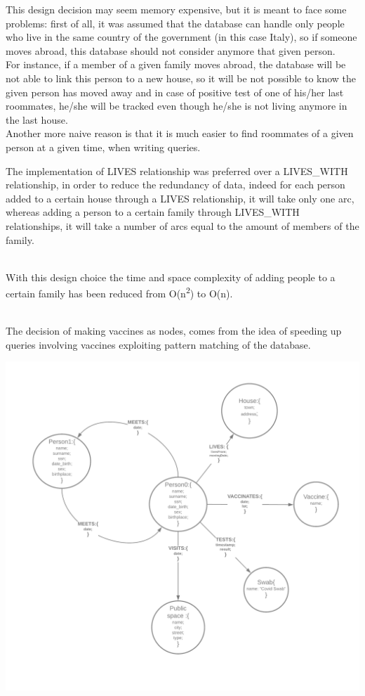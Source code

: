\documentclass{article}
\begin{document}
This design decision may seem memory expensive, but it is meant to face some problems: first of all, it was assumed that the database
can handle only people who live in the same country of the government (in this case Italy), so if someone moves abroad, this database should not consider anymore that given person.
\\For instance, if a member of a given family moves abroad, the database
will be not able to link this person to a new house, so it will be not possible to know the given person has moved away and in
case of positive test of one of his/her last roommates, he/she will be tracked even though he/she is not living anymore in the last house.
\\Another more naive reason is that it is much easier to find roommates of a given person at a given time, when writing queries.

The implementation of LIVES relationship was preferred over a LIVES\_WITH relationship, in order to
reduce the redundancy of data, indeed for each person added to a certain house through a LIVES relationship,
it will take only one arc, whereas adding a person to a certain family through LIVES\_WITH relationships, it will take a number of arcs equal to the amount of members of the family.

\\With this design choice the time and space complexity of adding people to a certain family has been reduced
from O(n\textsuperscript{2}) to O(n).

\\The decision of making vaccines as nodes, comes from the idea of speeding up queries involving vaccines
exploiting pattern matching of the database.

\begin{center}
\includegraphics[scale=0.15]{Graph_diagram.png}
\end{center}
\end{document}

